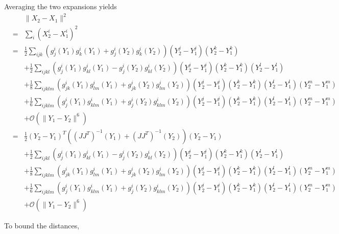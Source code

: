 \documentclass[12pt]{article}
\begin{document}
Averaging the two expansions yields
\begin{eqnarray}
&&\| X_2 - X_1 \|^2 \\
&=&  \sum_i (X_2^i - X_1^i)^2 \\
&=& \frac{1}{2} \sum_{ijk} \left( g_j^i (Y_1) g_k^i (Y_1) + g_j^i (Y_2) g_k^i (Y_2) \right) (Y^j_2 - Y^j_1 ) (Y^k_2 - Y^k_1 ) \\
&& + \frac{1}{2} \sum_{ijkl} \left( g_j^i (Y_1) g^i_{kl} (Y_1) - g_j^i (Y_2) g^i_{kl} (Y_2) \right) (Y^j_2 - Y^j_1 )  (Y^k_2 - Y^k_1)(Y^l_2 - Y^l_1) \\
&& + \frac{1}{8} \sum_{ijklm}  \left( g^i_{jk} (Y_1) g^i_{lm} (Y_1) + g^i_{jk} (Y_2) g^i_{lm} (Y_2)  \right) (Y^j_2 - Y^j_1) (Y^k_2 - Y^k_1) (Y^l_2 - Y^l_1) (Y^m_2 - Y^m_1) \\
&& + \frac{1}{6} \sum_{ijklm}  \left( g^i_{j} (Y_1) g^i_{klm} (Y_1) + g^i_{j} (Y_2) g^i_{klm} (Y_2)  \right)(Y^j_2 - Y^j_1) (Y^k_2 - Y^k_1) (Y^l_2 - Y^l_1) (Y^m_2 - Y^m_1) \\
&& + \mathcal{O} (\|Y_1 - Y_2 \|^6 ) \\
&=& \frac{1}{2} (Y_2 - Y_1 )^T ((J J^T)^{-1} (Y_1) + (J J^T)^{-1}(Y_2)) (Y_2 - Y_1 ) \\
&& + \frac{1}{2} \sum_{ijkl} \left( g_j^i (Y_1) g^i_{kl} (Y_1) - g_j^i (Y_2) g^i_{kl} (Y_2) \right) (Y^j_2 - Y^j_1 )  (Y^k_2 - Y^k_1)(Y^l_2 - Y^l_1) \\
&& + \frac{1}{8} \sum_{ijklm}  \left( g^i_{jk} (Y_1) g^i_{lm} (Y_1) + g^i_{jk} (Y_2) g^i_{lm} (Y_2)  \right) (Y^j_2 - Y^j_1) (Y^k_2 - Y^k_1) (Y^l_2 - Y^l_1) (Y^m_2 - Y^m_1) \\
&& + \frac{1}{6} \sum_{ijklm}  \left( g^i_{j} (Y_1) g^i_{klm} (Y_1) + g^i_{j} (Y_2) g^i_{klm} (Y_2)  \right)(Y^j_2 - Y^j_1) (Y^k_2 - Y^k_1) (Y^l_2 - Y^l_1) (Y^m_2 - Y^m_1) \\
&& + \mathcal{O} (\|Y_1 - Y_2 \|^6 ) 
\end{eqnarray}

To bound the distances,
\end{document}
